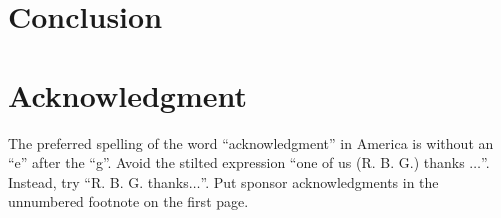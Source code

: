 \documentclass[conference]{IEEEtran}
\begin{document}
 




\section{Conclusion}


\section*{Acknowledgment}

The preferred spelling of the word ``acknowledgment'' in America is without 
an ``e'' after the ``g''. Avoid the stilted expression ``one of us (R. B. 
G.) thanks $\ldots$''. Instead, try ``R. B. G. thanks$\ldots$''. Put sponsor 
acknowledgments in the unnumbered footnote on the first page.





\ %



%
\end{document}
